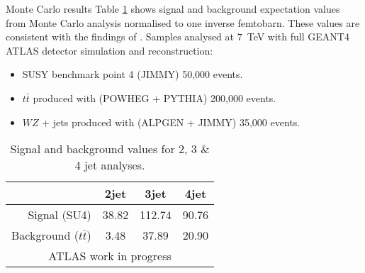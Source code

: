 \documentclass[final]{beamer} %
\begin{document}
\begin{frame}[t]
\begin{columns}[t]
\begin{column}{0.28\paperwidth}
   \begin{block}{Monte Carlo results}
    Table \ref{tb:results} shows signal and background expectation values
    from Monte Carlo analysis normalised to one inverse femtobarn. These
    values are consistent with the findings of \cite{7tevNote}. Samples analysed
    at $7$~TeV with full GEANT4 ATLAS detector simulation and reconstruction:
      \begin{itemize}
        \item SUSY benchmark point 4 (JIMMY) 50,000 events.
        \item $t\bar{t}$ produced with (POWHEG + PYTHIA) 200,000 events.
        \item $WZ$ + jets produced with (ALPGEN + JIMMY) 35,000 events.
      \end{itemize}
      \begin{table}
       \begin{tabular}{|r|c | c | c|}\hline
        & 2jet & 3jet & 4jet \\
        \hline
        Signal (SU4) & 38.82 & 112.74 & 90.76 \\
        Background ($t\bar{t}$) & 3.48 & 37.89 & 20.90 \\
        \hline
        \multicolumn{4}{|c|}{ATLAS work in progress} \\
        \hline
       \end{tabular}
       \caption{Signal and background values for 2, 3 \& 4 jet analyses.}
       \label{tb:results}
      \end{table}
   \end{block}
  \end{column}



\end{columns}
\end{frame}
\end{document}
